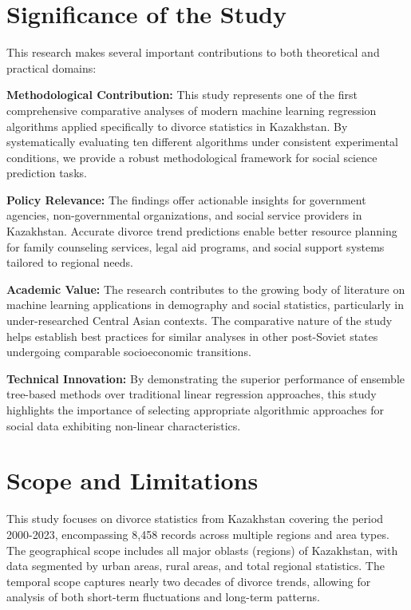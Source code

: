 \section{Significance of the Study}

This research makes several important contributions to both theoretical and practical domains:

\textbf{Methodological Contribution:} This study represents one of the first comprehensive comparative analyses of modern machine learning regression algorithms applied specifically to divorce statistics in Kazakhstan. By systematically evaluating ten different algorithms under consistent experimental conditions, we provide a robust methodological framework for social science prediction tasks.

\textbf{Policy Relevance:} The findings offer actionable insights for government agencies, non-governmental organizations, and social service providers in Kazakhstan. Accurate divorce trend predictions enable better resource planning for family counseling services, legal aid programs, and social support systems tailored to regional needs.

\textbf{Academic Value:} The research contributes to the growing body of literature on machine learning applications in demography and social statistics, particularly in under-researched Central Asian contexts. The comparative nature of the study helps establish best practices for similar analyses in other post-Soviet states undergoing comparable socioeconomic transitions.

\textbf{Technical Innovation:} By demonstrating the superior performance of ensemble tree-based methods over traditional linear regression approaches, this study highlights the importance of selecting appropriate algorithmic approaches for social data exhibiting non-linear characteristics.

\section{Scope and Limitations}

This study focuses on divorce statistics from Kazakhstan covering the period 2000-2023, encompassing 8,458 records across multiple regions and area types. The geographical scope includes all major oblasts (regions) of Kazakhstan, with data segmented by urban areas, rural areas, and total regional statistics. The temporal scope captures nearly two decades of divorce trends, allowing for analysis of both short-term fluctuations and long-term patterns.

